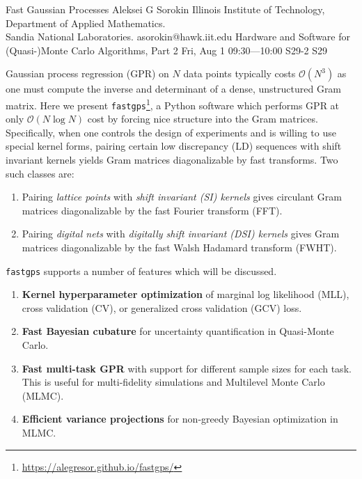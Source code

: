 \begin{talk}
  {Fast Gaussian Processes}%
  {Aleksei G Sorokin}%
  {Illinois Institute of Technology, Department of Applied Mathematics. \\ Sandia National Laboratories.}%
  {asorokin@hawk.iit.edu}%
  {}%
  {Hardware and Software for (Quasi-)Monte Carlo Algorithms, Part 2}%
  {Fri, Aug 1 09:30---10:00}%
  {S29-2}%
  {S29}%
    

        Gaussian process regression (GPR) on $N$ data points typically costs $\mathcal{O}(N^3)$ as one must compute the inverse and determinant of a dense, unstructured Gram matrix. Here we present \texttt{fastgps}\footnote{\url{https://alegresor.github.io/fastgps/}}, a Python software which performs GPR at only $\mathcal{O}(N \log N)$ cost by forcing nice structure into the Gram matrices. Specifically, when one controls the design of experiments and is willing to use special kernel forms, pairing certain low discrepancy (LD) sequences with shift invariant kernels yields Gram matrices diagonalizable by fast transforms. Two such classes are:
        \begin{enumerate}
          \item Pairing \emph{lattice points} with \emph{shift invariant (SI) kernels} gives circulant Gram matrices diagonalizable by the fast Fourier transform (FFT). 
          \item Pairing \emph{digital nets} with \emph{digitally shift invariant (DSI) kernels} gives Gram matrices diagonalizable by the fast Walsh Hadamard transform (FWHT). 
        \end{enumerate}
        \texttt{fastgps} supports a number of features which will be discussed. 
        \begin{enumerate}
          \item \textbf{Kernel hyperparameter optimization} of marginal log likelihood (MLL), cross validation (CV), or generalized cross validation (GCV) loss.
          \item \textbf{Fast Bayesian cubature} for uncertainty quantification in Quasi-Monte Carlo. 
          \item \textbf{Fast multi-task GPR} with support for different sample sizes for each task. This is useful for multi-fidelity simulations and Multilevel Monte Carlo (MLMC). 
          \item \textbf{Efficient variance projections} for non-greedy Bayesian optimization in MLMC.

\end{enumerate}
\end{talk}
